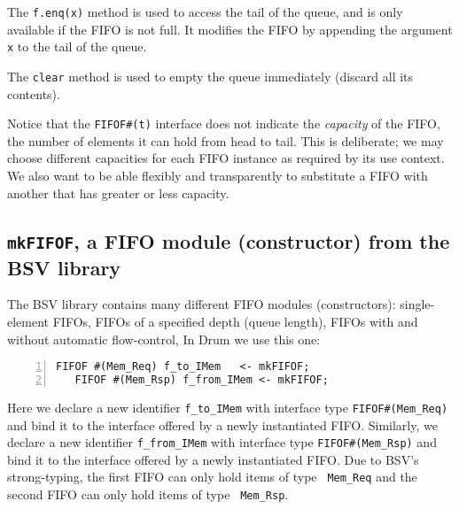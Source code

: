 The \verb|f.enq(x)| method is used to access the tail of the queue,
and is only available if the FIFO is not full.  It modifies the FIFO
by appending the argument \verb|x| to the tail of the queue.

The \verb|clear| method is used to empty the queue immediately
(discard all its contents).

Notice that the {\tt FIFOF\#(t)} interface does not indicate the
\emph{capacity} of the FIFO, {\ie} the number of elements it can hold
from head to tail.  This is deliberate; we may choose different
capacities for each FIFO instance as required by its use context.  We
also want to be able flexibly and transparently to substitute a FIFO
with another that has greater or less capacity.


\subsection{{\tt mkFIFOF}, a FIFO module (constructor) from the BSV library}




The BSV library contains many different FIFO modules (constructors):
single-element FIFOs, FIFOs of a specified depth (queue length), FIFOs
with and without automatic flow-control, {\etc} In Drum we use
this one:


{\small
\begin{Verbatim}[frame=single, numbers=left]
   FIFOF #(Mem_Req) f_to_IMem   <- mkFIFOF;
   FIFOF #(Mem_Rsp) f_from_IMem <- mkFIFOF;
\end{Verbatim}
}

Here we declare a new identifier \verb|f_to_IMem| with interface type
\verb|FIFOF#(Mem_Req)| and bind it to the interface offered by a newly
instantiated FIFO.  Similarly, we declare a new identifier
\verb|f_from_IMem| with interface type \verb|FIFOF#(Mem_Rsp)| and bind
it to the interface offered by a newly instantiated FIFO.  Due to
BSV's strong-typing, the first FIFO can only hold items of type {\tt
Mem\_Req} and the second FIFO can only hold items of type {\tt
Mem\_Rsp}.

